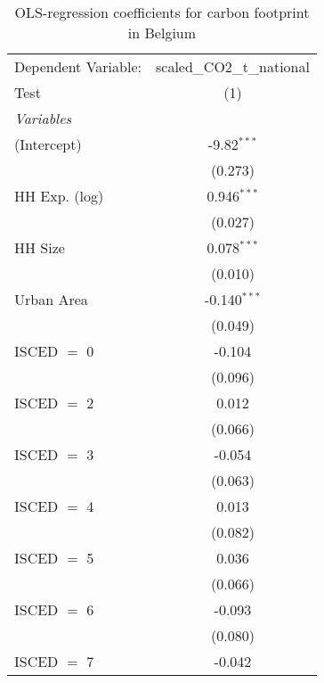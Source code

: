 
\begin{table}[htbp!]
   \centering
   \small
   \begin{adjustbox}{width = 1\textwidth, max height = 0.95\textheight, center}
      \begin{threeparttable}[b]
         \caption{\label{tab:OLS_2_BEL} OLS-regression coefficients for carbon footprint in Belgium}
         \begin{tabular}{lc}
            \tabularnewline \midrule \midrule
            Dependent Variable: & scaled\_CO2\_t\_national\\     
            Test                & (1)\\  
            \midrule
            \emph{Variables}\\
            (Intercept)         & -9.82$^{***}$\\   
                                & (0.273)\\   
            HH Exp. (log)       & 0.946$^{***}$\\   
                                & (0.027)\\   
            HH Size             & 0.078$^{***}$\\   
                                & (0.010)\\   
            Urban Area          & -0.140$^{***}$\\   
                                & (0.049)\\   
            ISCED $=$ 0         & -0.104\\   
                                & (0.096)\\   
            ISCED $=$ 2         & 0.012\\   
                                & (0.066)\\   
            ISCED $=$ 3         & -0.054\\   
                                & (0.063)\\   
            ISCED $=$ 4         & 0.013\\   
                                & (0.082)\\   
            ISCED $=$ 5         & 0.036\\   
                                & (0.066)\\   
            ISCED $=$ 6         & -0.093\\   
                                & (0.080)\\   
            ISCED $=$ 7         & -0.042\\   

\end{tabular}
\end{threeparttable}
\end{adjustbox}
\end{table}
